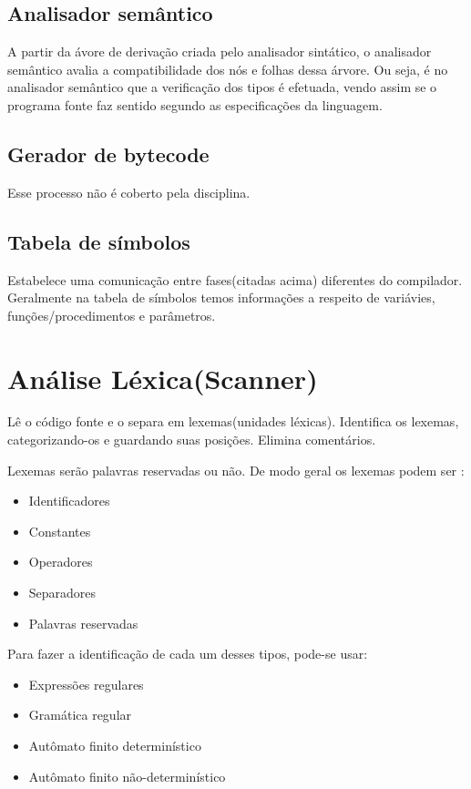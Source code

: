 \documentclass[11pt]{article}
\begin{document}
\subsection{Analisador semântico}
\label{sec:org357c967}
A partir da ávore de derivação criada pelo analisador sintático, o
analisador semântico avalia a compatibilidade dos nós e folhas
dessa árvore. Ou seja, é no analisador semântico que a verificação
dos tipos é efetuada, vendo assim se o programa fonte faz sentido
segundo as especificações da linguagem.

\subsection{Gerador de bytecode}
\label{sec:org457c11e}
Esse processo não é coberto pela disciplina.

\subsection{Tabela de símbolos}
\label{sec:orgae38d12}
Estabelece uma comunicação entre fases(citadas acima) diferentes do
compilador. Geralmente na tabela de símbolos temos informações a
respeito de variávies, funções/procedimentos e parâmetros.
\section{Análise Léxica(Scanner)}
\label{sec:orgbd0e223}
Lê o código fonte e o separa em lexemas(unidades
léxicas). Identifica os lexemas, categorizando-os e guardando suas
posições. Elimina comentários.

Lexemas serão palavras reservadas ou não. De modo geral os lexemas
podem ser :
\begin{itemize}
\item Identificadores
\item Constantes
\item Operadores
\item Separadores
\item Palavras reservadas
\end{itemize}

Para fazer a identificação de cada um desses tipos, pode-se usar:
\begin{itemize}
\item Expressões regulares
\item Gramática regular
\item Autômato finito determinístico
\item Autômato finito não-determinístico
\end{itemize}
\end{document}
